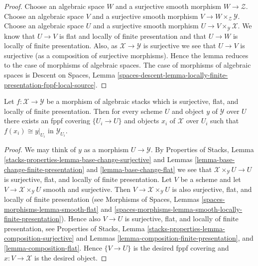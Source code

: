 \begin{proof}
Choose an algebraic space $W$ and a surjective smooth morphism
$W \to \mathcal{Z}$. Choose an algebraic space $V$ and a surjective smooth
morphism $V \to W \times_\mathcal{Z} \mathcal{Y}$. Choose an algebraic space
$U$ and a surjective smooth morphism $U \to V \times_\mathcal{Y} \mathcal{X}$.
We know that $U \to V$ is flat and locally of finite presentation
and that $U \to W$ is locally of finite presentation.
Also, as $\mathcal{X} \to \mathcal{Y}$ is surjective we see that
$U \to V$ is surjective (as a composition of surjective morphisms).
Hence the lemma reduces to the case of morphisms of algebraic spaces.
The case of morphisms of algebraic spaces is
Descent on Spaces, Lemma
\ref{spaces-descent-lemma-locally-finite-presentation-fppf-local-source}.
\end{proof}

\begin{lemma}
\label{lemma-surjective-flat-locally-finite-presentation}
Let $f : \mathcal{X} \to \mathcal{Y}$ be a morphism of algebraic stacks
which is surjective, flat, and locally of finite presentation.
Then for every scheme $U$ and object $y$ of $\mathcal{Y}$ over $U$
there exists an fppf covering $\{U_i \to U\}$ and objects $x_i$
of $\mathcal{X}$ over $U_i$ such that $f(x_i) \cong y|_{U_i}$ in
$\mathcal{Y}_{U_i}$.
\end{lemma}

\begin{proof}
We may think of $y$ as a morphism $U \to \mathcal{Y}$. By
Properties of Stacks, Lemma
\ref{stacks-properties-lemma-base-change-surjective}
and
Lemmas \ref{lemma-base-change-finite-presentation} and
\ref{lemma-base-change-flat}
we see that $\mathcal{X} \times_\mathcal{Y} U \to U$ is surjective, flat,
and locally of finite presentation. Let $V$ be a scheme and let
$V \to \mathcal{X} \times_\mathcal{Y} U$ smooth and surjective.
Then $V \to \mathcal{X} \times_\mathcal{Y} U$ is also surjective, flat, and
locally of finite presentation (see
Morphisms of Spaces, Lemmas
\ref{spaces-morphisms-lemma-smooth-flat} and
\ref{spaces-morphisms-lemma-smooth-locally-finite-presentation}).
Hence also $V \to U$ is surjective, flat, and
locally of finite presentation, see
Properties of Stacks, Lemma
\ref{stacks-properties-lemma-composition-surjective}
and
Lemmas \ref{lemma-composition-finite-presentation}, and
\ref{lemma-composition-flat}.
Hence $\{V \to U\}$ is the desired fppf covering and $x : V \to \mathcal{X}$
is the desired object.
\end{proof}

